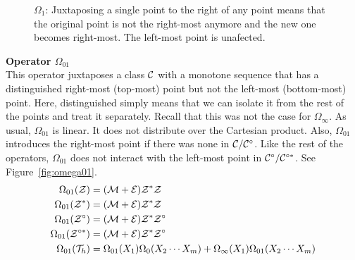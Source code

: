 \documentclass[12pt, a4paper, twoside]{report}
\begin{document}
\begin{figure}[ht]
 \centering
    \caption{$\Omega_1$: Juxtaposing a single point to the right of any point means that the original point is not the right-most anymore and the new one becomes right-most. The left-most point is unafected.}
    \label{fig:omega_1}
\end{figure}

\noindent\textbf{Operator $\Omega_{01}$}\\
This operator juxtaposes a class $\mathcal{C}$ with a monotone sequence that has a distinguished right-most (top-most) point but not the left-most (bottom-most) point. Here, distinguished simply means that we can isolate it from the rest of the points and treat it separately. Recall that this was not the case for $\Omega_\infty$. As usual, $\Omega_{01}$ is linear. It does not distribute over the Cartesian product. Also, $\Omega_{01}$ introduces the right-most point if there was none in $\mathcal{C}/\mathcal{C}^\circ$. Like the rest of the operators, $\Omega_{01}$ does not interact with the left-most point in $\mathcal{C}^\circ/\mathcal{C}^{\circ*}$. See Figure~\ref{fig:omega01}.
\begin{align}
  \begin{aligned}
  \Omega_{01}(\mathcal{Z}) &= (\mathcal{M}+\mathcal{E})\mathcal{Z}^*\mathcal{Z}\\
  \Omega_{01}(\mathcal{Z}^*) &= (\mathcal{M}+\mathcal{E})\mathcal{Z}^*\mathcal{Z}\\
  \Omega_{01}(\mathcal{Z}^\circ) &= (\mathcal{M}+\mathcal{E})\mathcal{Z}^*\mathcal{Z}^\circ\\
  \Omega_{01}(\mathcal{Z}^{\circ*}) &= (\mathcal{M}+\mathcal{E})\mathcal{Z}^*\mathcal{Z}^\circ\\
  \Omega_{01}(\mathcal{T}_h) &= \Omega_{01}(X_1)\Omega_0(X_2\cdots X_m)+\Omega_\infty(X_1)\Omega_{01}(X_2\cdots X_m)
\end{aligned}
                      \label{eq:iterjuxt_def_omega01}
\end{align}
\end{document}
